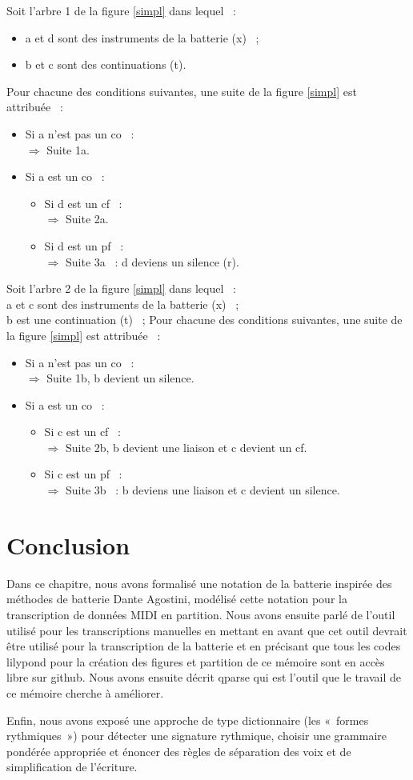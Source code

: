 Soit l’arbre 1 de la figure \ref{simpl} dans lequel~ :
\begin{itemize}
    \item a et d sont des instruments de la batterie (x)~ ;
    \item b et c sont des continuations (t).
\end{itemize}
Pour chacune des conditions suivantes, une suite de la
figure \ref{simpl} est attribuée~ :
\begin{itemize}
	\item Si a n’est pas un co~ :\\
	$\Rightarrow$ Suite 1a.
	\item Si a est un co~ :
	\begin{itemize}
		\item Si d est un cf~ :\\
		$\Rightarrow$ Suite 2a.
		\item Si d est un pf~ :\\
		$\Rightarrow$ Suite 3a~ : d deviens un silence (r).\\
	\end{itemize}
\end{itemize}
Soit l’arbre 2 de la figure \ref{simpl} dans lequel~ :\\
a et c sont des instruments de la batterie (x)~ ;\\
b est une continuation (t)~ ;
Pour chacune des conditions suivantes, une suite de la figure \ref{simpl} est
attribuée~ :
\begin{itemize}
	\item Si a n’est pas un co~ :\\
	$\Rightarrow$ Suite 1b, b devient un silence.
	\item Si a est un co~ :
	\begin{itemize}
		\item Si c est un cf~ :\\
		$\Rightarrow$ Suite 2b, b devient une liaison et c devient un cf.
		\item Si c est un pf~ :\\
		$\Rightarrow$ Suite 3b~ : b deviens une liaison et c devient un silence.
	\end{itemize}
\end{itemize}

\section*{Conclusion}
Dans ce chapitre, nous avons formalisé une notation de la batterie inspirée des
méthodes de batterie Dante Agostini, modélisé cette notation pour
la transcription de données MIDI en partition.
Nous avons ensuite parlé de l’outil utilisé pour les transcriptions manuelles
en mettant en avant que cet outil devrait être utilisé pour la transcription de
la batterie et en précisant que tous les codes lilypond pour la création des
figures et partition de ce mémoire sont en accès libre sur github. Nous avons
ensuite décrit qparse qui est l’outil que le travail de ce mémoire cherche à
améliorer.

Enfin, nous avons exposé une approche de type dictionnaire (les «~formes
rythmiques~») pour détecter une signature rythmique, choisir une grammaire
pondérée appropriée et énoncer des règles de séparation des voix et de
simplification de l’écriture.
